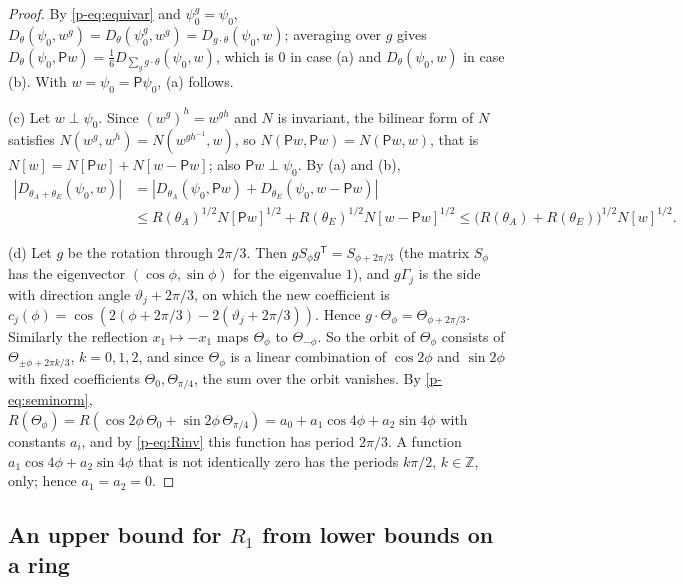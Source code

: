 \documentclass[11pt]{article}
\theoremstyle{remark}
\begin{document}
\begin{proof}
By \eqref{p-eq:equivar} and $\psi_0^g=\psi_0$,
$D_\theta(\psi_0,w^g)=D_\theta(\psi_0^g,w^g)=D_{g\cdot\theta}(\psi_0,w)$; averaging over $g$
gives $D_\theta(\psi_0,\mathsf Pw)=\frac16D_{\sum_gg\cdot\theta}(\psi_0,w)$, which is $0$ in case
(a) and $D_\theta(\psi_0,w)$ in case (b). With $w=\psi_0=\mathsf P\psi_0$, (a) follows.

(c) Let $w\perp\psi_0$. Since $(w^g)^h=w^{gh}$ and $N$ is invariant, the bilinear form of $N$
satisfies $N(w^g,w^h)=N(w^{gh^{-1}},w)$, so $N(\mathsf Pw,\mathsf Pw)=N(\mathsf Pw,w)$, that is
$N[w]=N[\mathsf Pw]+N[w-\mathsf Pw]$; also $\mathsf Pw\perp\psi_0$. By (a) and (b),
\begin{align*}
  |D_{\theta_A+\theta_E}(\psi_0,w)|&=|D_{\theta_A}(\psi_0,\mathsf Pw)+D_{\theta_E}(\psi_0,w-\mathsf Pw)|\\
  &\le R(\theta_A)^{1/2}N[\mathsf Pw]^{1/2}+R(\theta_E)^{1/2}N[w-\mathsf Pw]^{1/2}
  \le\bigl(R(\theta_A)+R(\theta_E)\bigr)^{1/2}N[w]^{1/2}.
\end{align*}

(d) Let $g$ be the rotation through $2\pi/3$. Then $gS_\phi g^{\mathsf T}=S_{\phi+2\pi/3}$
(the matrix $S_\phi$ has the eigenvector $(\cos\phi,\sin\phi)$ for the eigenvalue $1$), and
$g\Gamma_j$ is the side with direction angle $\vartheta_j+2\pi/3$, on which the new coefficient
is $c_j(\phi)=\cos(2(\phi+2\pi/3)-2(\vartheta_j+2\pi/3))$. Hence
$g\cdot\Theta_\phi=\Theta_{\phi+2\pi/3}$. Similarly the reflection $x_1\mapsto-x_1$ maps
$\Theta_\phi$ to $\Theta_{-\phi}$. So the orbit of $\Theta_\phi$ consists of
$\Theta_{\pm\phi+2\pi k/3}$, $k=0,1,2$, and since $\Theta_\phi$ is a linear combination of
$\cos2\phi$ and $\sin2\phi$ with fixed coefficients $\Theta_0,\Theta_{\pi/4}$, the sum over the
orbit vanishes. By \eqref{p-eq:seminorm},
$R(\Theta_\phi)=R(\cos2\phi\,\Theta_0+\sin2\phi\,\Theta_{\pi/4})=a_0+a_1\cos4\phi+a_2\sin4\phi$
with constants $a_i$, and by \eqref{p-eq:Rinv} this function has period $2\pi/3$. A function
$a_1\cos4\phi+a_2\sin4\phi$ that is not identically zero has the periods $k\pi/2$,
$k\in\mathbb Z$, only; hence $a_1=a_2=0$.
\end{proof}

\subsection{An upper bound for \texorpdfstring{$R_1$}{R1} from lower bounds on a ring}
\end{document}

